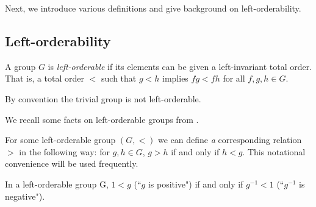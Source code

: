 \noindent{} Next, we introduce various definitions and give background on left-orderability.

\subsection{Left-orderability}



\begin{definition}
A group $G$ is {\it left-orderable} if its elements can be given a left-invariant total order. That is, a total order $<$ such that $g<h$ implies $fg<fh$ for all $f, g, h\in{}G$.
\end{definition}

\begin{remark} By convention the trivial group is not left-orderable.
\end{remark}

We recall some facts on left-orderable groups from \cite{ClayRolfsen}.

\begin{fact} For some left-orderable group $(G, <)$ we can define {\it a} corresponding relation $>$ in the following way: for $g,h\in{}G$, $g>h$ if and only if $h<g$. This notational convenience will be used frequently.
\end{fact}

\begin{fact} In a left-orderable group G, $1<g$ (``$g$ is positive") if and only if $g^{-1}<1$ (``$g^{-1}$ is negative").
\label{fact:inverses}
\end{fact}


